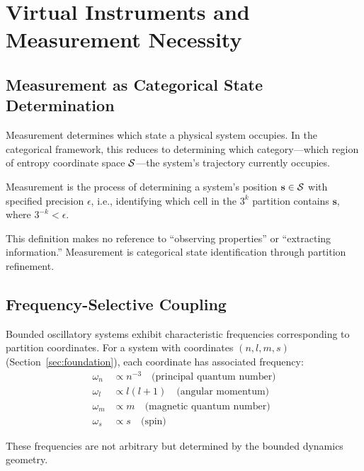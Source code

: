 \section{Virtual Instruments and Measurement Necessity}
\label{sec:virtual}

\subsection{Measurement as Categorical State Determination}

Measurement determines which state a physical system occupies. In the categorical framework, this reduces to determining which category—which region of entropy coordinate space $\mathcal{S}$—the system's trajectory currently occupies.

\begin{definition}[Measurement]
\label{def:measurement}
Measurement is the process of determining a system's position $\mathbf{s} \in \mathcal{S}$ with specified precision $\epsilon$, i.e., identifying which cell in the $3^k$ partition contains $\mathbf{s}$, where $3^{-k} < \epsilon$.
\end{definition}

This definition makes no reference to ``observing properties'' or ``extracting information.'' Measurement is categorical state identification through partition refinement.

\subsection{Frequency-Selective Coupling}

Bounded oscillatory systems exhibit characteristic frequencies corresponding to partition coordinates. For a system with coordinates $(n, l, m, s)$ (Section~\ref{sec:foundation}), each coordinate has associated frequency:
\begin{align}
\omega_n &\propto n^{-3} \quad \text{(principal quantum number)} \label{eq:freq_n} \\
\omega_l &\propto l(l+1) \quad \text{(angular momentum)} \label{eq:freq_l} \\
\omega_m &\propto m \quad \text{(magnetic quantum number)} \label{eq:freq_m} \\
\omega_s &\propto s \quad \text{(spin)} \label{eq:freq_s}
\end{align}

These frequencies are not arbitrary but determined by the bounded dynamics geometry.

